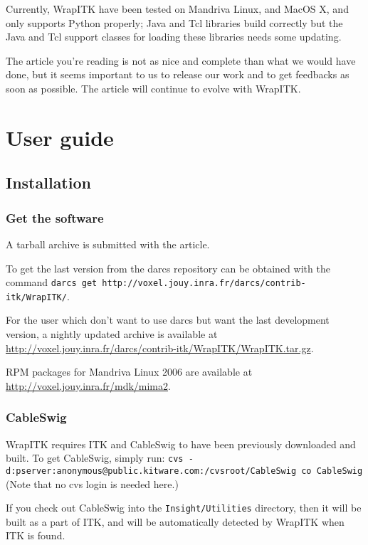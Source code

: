 \documentclass{InsightArticle}
\begin{document}
Currently, WrapITK have been tested on Mandriva Linux, and MacOS X, and only
supports Python properly; Java and Tcl libraries build
correctly but the Java and Tcl support classes for loading these libraries needs
some updating.

The article you're reading is not as nice and complete than what we would have
done, but it seems important to us to release our work and to get feedbacks
as soon as possible. The article will continue to evolve with WrapITK.


\section{User guide}

  \subsection{Installation}

    \subsubsection{Get the software}

A tarball archive is submitted with the article.

To get the last version from the darcs repository can be obtained
with the command 
\verb$darcs get http://voxel.jouy.inra.fr/darcs/contrib-itk/WrapITK/$.

For the user which don't want to use darcs but want the last development version,
a nightly updated archive is available at
\url{http://voxel.jouy.inra.fr/darcs/contrib-itk/WrapITK/WrapITK.tar.gz}.

RPM packages for Mandriva Linux 2006 are available at \url{http://voxel.jouy.inra.fr/mdk/mima2}.


    \subsubsection{CableSwig}

WrapITK requires ITK and CableSwig to have been previously downloaded and built.
To get CableSwig, simply run:
\verb$cvs -d:pserver:anonymous@public.kitware.com:/cvsroot/CableSwig co CableSwig$
(Note that no cvs login is needed here.)

If you check out CableSwig into the \verb$Insight/Utilities$ directory, then it will be
built as a part of ITK, and will be automatically detected by WrapITK when ITK
is found.
\end{document}
